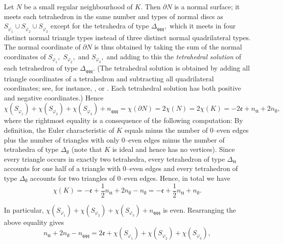\documentclass[a4paper]{gtart}
\def\Tee{\Delta_{\emptyset}}
\def\Ttt{\Delta_{\mathfrak{tt}}}
\def\Tqqq{\Delta_{\mathfrak{qqq}}}
\def\even{\mathfrak{e}}
\def\nee{n_{\emptyset}}
\def\ntt{n_{\mathfrak{tt}}}
\def\nqqq{n_{\mathfrak{qqq}}}
\theoremstyle{plain}
\theoremstyle{definition}
\theoremstyle{remark}
\numberwithin{equation}{section}
\begin{document}
Let $N$ be a small regular neighbourhood of $K.$ Then $\partial N$ is a normal surface; it meets each tetrahedron in the same number and types of normal discs as $S_{\varphi_1} \cup S_{\varphi_2}\cup S_{\varphi_3}$ except for the tetrahedra of type $\Tqqq,$ which it meets in four distinct normal triangle types instead of three distinct normal quadrilateral types. The normal coordinate of $\partial N$ is thus obtained by taking the sum of the normal coordinates of $S_{\varphi_1},$ $S_{\varphi_2},$ and $S_{\varphi_3},$ and adding to this the \emph{tetrahedral solution} of each tetrahedron of type $\Tqqq.$ (The tetrahedral solution is obtained by adding all triangle coordinates of a tetrahedron and subtracting all quadrilateral coordinates; see, for instance, \cite[Section]{Kang-ideal-2004}, or \cite[Section 2.8]{Tillmann-normal-2008}. Each tetrahedral solution has both positive and negative coordinates.) Hence
$$
\chi(S_{\varphi_1}) +\chi (S_{\varphi_2}) + \chi (S_{\varphi_3}) + \nqqq = \chi (\partial N) = 2 \chi(N) = 2 \chi(K) = - 2 \even +\ntt + 2\nee,$$
where the rightmost equality is a consequence of the following computation: By definition, the Euler characteristic of $K$ equals minus the number of 0--even edges plus the number of triangles with only 0--even edges minus the number of tetrahedra of type $\Tee$ (note that $K$ is ideal and hence has no vertices). Since every triangle occurs in exactly two tetrahedra, every tetrahedron of type $\Ttt$ accounts for one half of a triangle with 0--even edges and every tetrahedron of type $\Tee$ accounts for two triangles of 0--even edges. Hence, in total we have 
$$
\chi (K) = - \even + \frac12 \ntt + 2 \nee - \nee = -\even + \frac12 \ntt + \nee .
$$

In particular, 
$\chi(S_{\varphi_1}) +\chi (S_{\varphi_2}) + \chi (S_{\varphi_3}) + \nqqq$ is even.
Rearranging the above equality gives
\begin{equation}\label{eq:e}
\ntt + 2\nee -\nqqq = 2 \even  + \chi(S_{\varphi_1}) +\chi (S_{\varphi_2}) + \chi (S_{\varphi_3}),
\end{equation}
\end{document}
